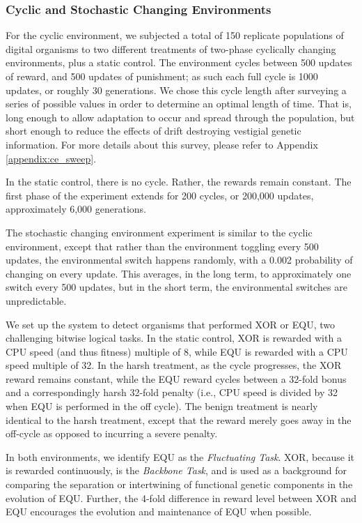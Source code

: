\documentclass[PhD]{msu-thesis}
\begin{document}
\subsubsection{Cyclic and Stochastic Changing Environments}
For the cyclic environment, we subjected a total of 150 replicate populations of digital organisms to two different treatments of two-phase cyclically changing environments, plus a static control. The environment cycles between 500 updates of reward, and 500 updates of punishment; as such each full cycle is 1000 updates, or roughly 30 generations. We chose this cycle length after surveying a series of possible values in order to determine an optimal length of time. That is, long enough to allow adaptation to occur and spread through the population, but short enough to reduce the effects of drift destroying vestigial genetic information. For more details about this survey, please refer to Appendix \ref{appendix:ce_sweep}.

In the static control, there is no cycle. Rather, the rewards remain constant. The first phase of the experiment extends for 200 cycles, or 200,000 updates, approximately 6,000 generations.

The stochastic changing environment experiment is similar to the cyclic environment, except that rather than the environment toggling every 500 updates, the environmental switch happens randomly, with a 0.002 probability of changing on every update. This averages, in the long term, to approximately one switch every 500 updates, but in the short term, the environmental switches are unpredictable.

We set up the system to detect organisms that performed XOR or EQU, two challenging bitwise logical tasks. In the static control, XOR is rewarded with a CPU speed (and thus fitness) multiple of 8, while EQU is rewarded with a CPU speed multiple of 32. In the harsh treatment, as the cycle progresses, the XOR reward remains constant, while the EQU reward cycles between a 32-fold bonus and a correspondingly harsh 32-fold penalty (i.e., CPU speed is divided by 32 when EQU is performed in the off cycle). The benign treatment is nearly identical to the harsh treatment, except that the reward merely goes away in the off-cycle as opposed to incurring a severe penalty.

In both environments, we identify EQU as the \textit{Fluctuating Task}. XOR, because it is rewarded continuously, is the \textit{Backbone Task}, and is used as a background for comparing the separation or intertwining of functional genetic components in the evolution of EQU. Further, the 4-fold difference in reward level between XOR and EQU encourages the evolution and maintenance of EQU when possible.
\end{document}

